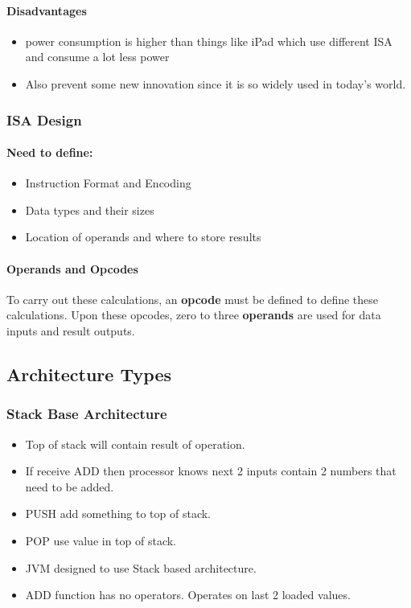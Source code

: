 \documentclass{article}
\newcommand\tab[1][0.5cm]{\hspace*{#1}}
\begin{document}
			\paragraph{\tab Disadvantages}
				\begin{itemize}
					\item power consumption is higher than things like iPad which use different ISA and consume a lot less power
					\item Also prevent some new innovation since it is so widely used in today's world.
				\end{itemize}


		\subsubsection*{ISA Design}
			\paragraph{\tab Need to define:}
			\begin{itemize}
				\item Instruction Format and Encoding
				\item Data types and their sizes
				\item Location of operands and where to store results
			\end{itemize}

		\paragraph{\tab Operands and Opcodes} To carry out these calculations, an \textbf{opcode} must be defined to define these calculations. Upon these opcodes, zero to three \textbf{operands} are used for data inputs and result outputs.

	\subsection*{Architecture Types}
		\subsubsection*{Stack Base Architecture}
			\begin{itemize}
				\item Top of stack will contain result of operation.
				\item If receive ADD then processor knows next 2 inputs contain 2 numbers that need to be added.
				\item PUSH add something to top of stack.
				\item POP use value in top of stack.
				\item JVM designed to use Stack based architecture.
				\item ADD function has no operators. Operates on last 2 loaded values.
			\end{itemize}
\end{document}
